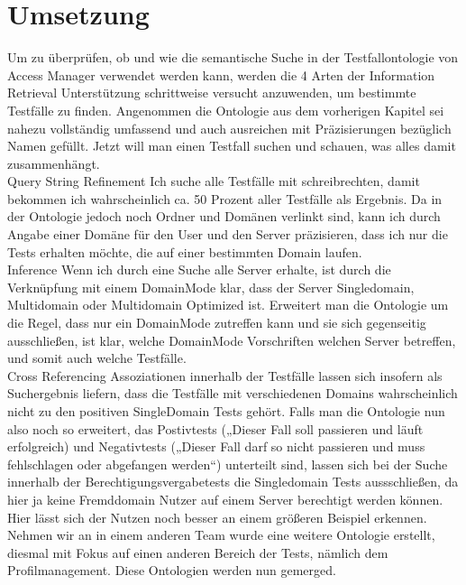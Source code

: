\section{Umsetzung}
Um zu überprüfen, ob und wie die semantische Suche in der Testfallontologie von Access Manager verwendet werden kann, werden die 4 Arten der Information Retrieval Unterstützung schrittweise versucht anzuwenden, um bestimmte Testfälle zu finden.\newline
Angenommen die Ontologie aus dem vorherigen Kapitel sei nahezu vollständig umfassend und auch ausreichen mit Präzisierungen bezüglich Namen gefüllt. Jetzt will man einen Testfall suchen und schauen, was alles damit zusammenhängt.\\

Query String Refinement\newline
Ich suche alle Testfälle mit schreibrechten, damit bekommen ich wahrscheinlich ca. 50 Prozent aller Testfälle als Ergebnis. Da in der Ontologie jedoch noch Ordner und Domänen verlinkt sind, kann ich durch Angabe einer Domäne für den User und den Server präzisieren, dass ich nur die Tests erhalten möchte, die auf einer bestimmten Domain laufen.\\

Inference\newline
Wenn ich durch eine Suche alle Server erhalte, ist durch die Verknüpfung mit einem DomainMode klar, dass der Server Singledomain, Multidomain oder Multidomain Optimized ist. Erweitert man die Ontologie um die Regel, dass nur ein DomainMode zutreffen kann und sie sich gegenseitig ausschließen, ist klar, welche DomainMode Vorschriften welchen Server betreffen, und somit auch welche Testfälle.\\

Cross Referencing \newline
Assoziationen innerhalb der Testfälle lassen sich insofern als Suchergebnis liefern, dass die Testfälle mit verschiedenen Domains wahrscheinlich nicht zu den positiven SingleDomain Tests gehört. Falls man die Ontologie nun also noch so erweitert, das Postivtests („Dieser Fall soll passieren und läuft erfolgreich) und Negativtests („Dieser Fall darf so nicht passieren und muss fehlschlagen oder abgefangen werden“) unterteilt sind, lassen sich bei der Suche innerhalb der Berechtigungsvergabetests die Singledomain Tests aussschließen, da hier ja keine Fremddomain Nutzer auf einem Server berechtigt werden können. \newline
Hier lässt sich der Nutzen noch besser an einem größeren Beispiel erkennen. Nehmen wir an in einem anderen Team wurde eine weitere Ontologie erstellt, diesmal mit Fokus auf einen anderen Bereich der Tests, nämlich dem Profilmanagement. Diese Ontologien werden nun gemerged.\\

